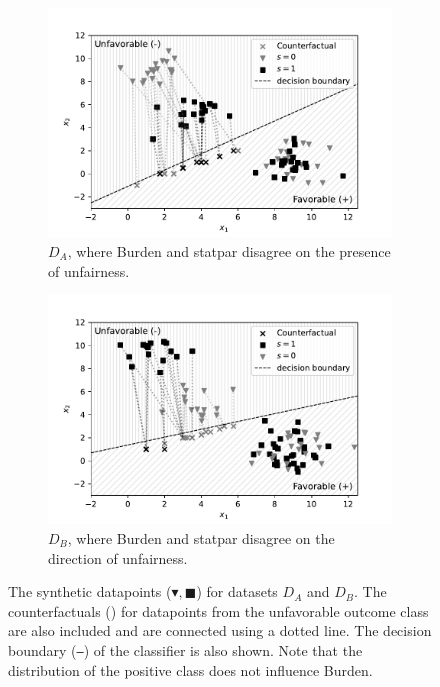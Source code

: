 \documentclass[runningheads]{llncs}
\begin{document}
\begin{figure}
    \centering
    \begin{subfigure}{0.49\textwidth}
        \includegraphics[width=\textwidth]{img/syndata-A-bw}
        \caption{$D_A$, where \gls{Burden} and \gls{statpar} disagree on the presence of unfairness.}
        \label{fig:syndatafavor}
    \end{subfigure}
    \begin{subfigure}{0.49\textwidth}
        \includegraphics[width=\textwidth]{img/syndata-B-bw}
        \caption{$D_B$, where \gls{Burden} and \gls{statpar} disagree on the direction of unfairness.}
        \label{fig:syndataunfavor}
    \end{subfigure}
    \caption{The synthetic datapoints ($\blacktriangledown,\blacksquare$) for datasets $D_A$ and $D_B$. The counterfactuals (\texttimes) for datapoints from the unfavorable outcome class are also included and are connected using a dotted line. The decision boundary (\texttt{---}) of the classifier is also shown. Note that the distribution of the positive class does not influence \gls{Burden}.}
    \label{fig:syndataplot}
\end{figure}
\end{document}
